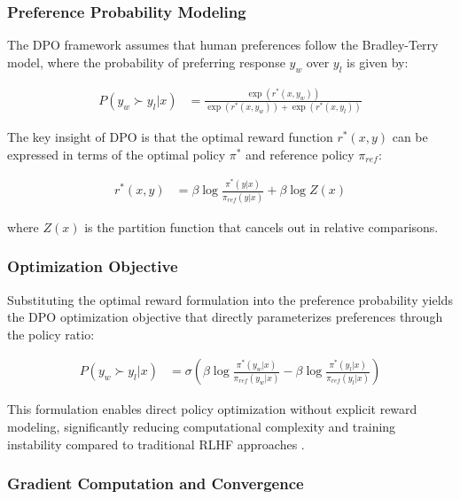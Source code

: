\subsubsection{Preference Probability Modeling}

The DPO framework assumes that human preferences follow the Bradley-Terry model, where the probability of preferring response $y_w$ over $y_l$ is given by:

\begin{align}
P(y_w \succ y_l | x) &= \frac{\exp(r^*(x, y_w))}{\exp(r^*(x, y_w)) + \exp(r^*(x, y_l))} \label{eq:preference-probability}
\end{align}

The key insight of DPO is that the optimal reward function $r^*(x, y)$ can be expressed in terms of the optimal policy $\pi^*$ and reference policy $\pi_{ref}$:

\begin{align}
r^*(x, y) &= \beta \log \frac{\pi^*(y|x)}{\pi_{ref}(y|x)} + \beta \log Z(x) \label{eq:optimal-reward}
\end{align}

where $Z(x)$ is the partition function that cancels out in relative comparisons.

\subsubsection{Optimization Objective}

Substituting the optimal reward formulation into the preference probability yields the DPO optimization objective that directly parameterizes preferences through the policy ratio:

\begin{align}
P(y_w \succ y_l | x) &= \sigma \left( \beta \log \frac{\pi^*(y_w|x)}{\pi_{ref}(y_w|x)} - \beta \log \frac{\pi^*(y_l|x)}{\pi_{ref}(y_l|x)} \right) \label{eq:dpo-preference}
\end{align}

This formulation enables direct policy optimization without explicit reward modeling, significantly reducing computational complexity and training instability compared to traditional RLHF approaches \cite{liu2024understanding_reference_policies}.

\subsubsection{Gradient Computation and Convergence}

